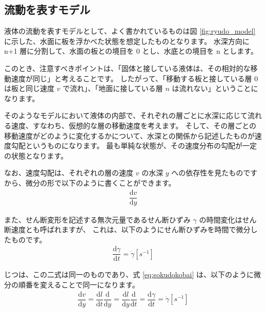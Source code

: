 \documentclass[uplatex,dvipdfmx,a4paper,11pt]{jsarticle}
\begin{document}
\subsection{流動を表すモデル}

液体の流動を表すモデルとして、よく書かれているものは図 \ref{fig:ryudo_model} に示した、水面に板を浮かべた状態を想定したものとなります。
水深方向に n+1 層に分割して、水面の板との境目を 0 とし、水底との境目を n とします。

このとき、注意すべきポイントは、「固体と接している液体は、その相対的な移動速度が同じ」と考えることです。
したがって、「移動する板と接している層 0 は板と同じ速度 $v$ で流れ」、「地面に接している層 $n$ は流れない」ということになります。

そのようなモデルにおいて液体の内部で、それぞれの層ごとに水深に応じて流れる速度、すなわち、仮想的な層の移動速度を考えます。
そして、その層ごとの移動速度がどのように変化するかについて、水深との関係から記述したものが速度勾配というものになります。
最も単純な状態が、その速度分布の勾配が一定の状態となります。

なお、速度勾配は、それぞれの層の速度 $v$ の水深 $y$ への依存性を見たものですから、微分の形で以下のように書くことができます。
\begin{align}
	\dfrac{\mathrm{d} v}{\mathrm{d} y}
	\label{eq:sokudokobai}
\end{align}

また、せん断変形を記述する無次元量であるせん断ひずみ $\gamma$ の時間変化はせん断速度とも呼ばれますが、
これは、以下のようにせん断ひずみを時間で微分したものです。
\begin{align}
	\dfrac{\mathrm{d} \gamma}{\mathrm{d} t} =\dot{\gamma} [s^{-1}]
\end{align}

じつは、この二式は同一のものであり、式 \eqref{eq:sokudokobai} は、以下のように微分の順番を変えることで同一になります。
\begin{align}
	\dfrac{\mathrm{d} v}{\mathrm{d} y} 
	= \dfrac{\mathrm{d} l}{\mathrm{d} t} \dfrac{\mathrm{d} }{\mathrm{d} y}
	= \dfrac{\mathrm{d} l}{\mathrm{d} y} \dfrac{\mathrm{d} }{\mathrm{d} t}
	= \dfrac{\mathrm{d} \gamma}{\mathrm{d} t} =\dot{\gamma} [s^{-1}]
\end{align}
\end{document}
